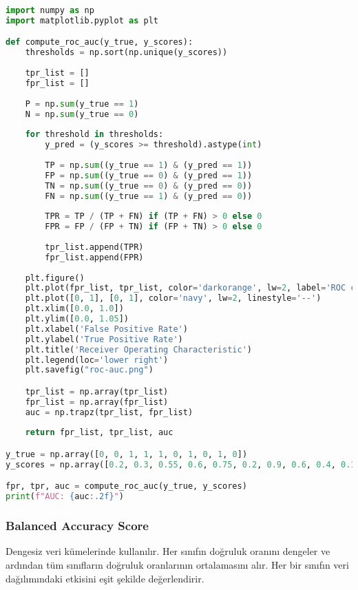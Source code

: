 \begin{lstlisting}[language=Python]
import numpy as np
import matplotlib.pyplot as plt

def compute_roc_auc(y_true, y_scores):
    thresholds = np.sort(np.unique(y_scores))
    
    tpr_list = []
    fpr_list = []
    
    P = np.sum(y_true == 1)
    N = np.sum(y_true == 0)
    
    for threshold in thresholds:
        y_pred = (y_scores >= threshold).astype(int)
        
        TP = np.sum((y_true == 1) & (y_pred == 1))
        FP = np.sum((y_true == 0) & (y_pred == 1))
        TN = np.sum((y_true == 0) & (y_pred == 0))
        FN = np.sum((y_true == 1) & (y_pred == 0))
        
        TPR = TP / (TP + FN) if (TP + FN) > 0 else 0
        FPR = FP / (FP + TN) if (FP + TN) > 0 else 0
        
        tpr_list.append(TPR)
        fpr_list.append(FPR)
    
    plt.figure()
    plt.plot(fpr_list, tpr_list, color='darkorange', lw=2, label='ROC curve')
    plt.plot([0, 1], [0, 1], color='navy', lw=2, linestyle='--')
    plt.xlim([0.0, 1.0])
    plt.ylim([0.0, 1.05])
    plt.xlabel('False Positive Rate')
    plt.ylabel('True Positive Rate')
    plt.title('Receiver Operating Characteristic')
    plt.legend(loc='lower right')
    plt.savefig("roc-auc.png")

    tpr_list = np.array(tpr_list)
    fpr_list = np.array(fpr_list)
    auc = np.trapz(tpr_list, fpr_list)
    
    return fpr_list, tpr_list, auc

y_true = np.array([0, 0, 1, 1, 1, 0, 1, 0, 1, 0])
y_scores = np.array([0.2, 0.3, 0.55, 0.6, 0.75, 0.2, 0.9, 0.6, 0.4, 0.1])

fpr, tpr, auc = compute_roc_auc(y_true, y_scores)
print(f"AUC: {auc:.2f}")
\end{lstlisting}

\newpage

\subsubsection{Balanced Accuracy Score}

Dengesiz veri kümelerinde kullanılır. Her sınıfın doğruluk oranını dengeler ve ardından tüm sınıfların doğruluk oranlarının ortalamasını alır. Her bir sınıfın veri dağılımındaki etkisini eşit şekilde değerlendirir.

